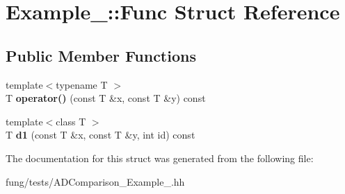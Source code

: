 \hypertarget{structExample__3_1_1Func}{\section{Example\-\_\-:\-:Func Struct Reference}
\label{structExample__3_1_1Func}
}
\subsection*{Public Member Functions}
\begin{DoxyCompactItemize}
\item 
\hypertarget{structExample__3_1_1Func_a9019e97274552641751321381f486201}{{\footnotesize template$<$typename T $>$ }\\T {\bfseries operator()} (const T \&x, const T \&y) const }\label{structExample__3_1_1Func_a9019e97274552641751321381f486201}

\item 
\hypertarget{structExample__3_1_1Func_aaedc133df3b49b8657782003837b66f1}{{\footnotesize template$<$class T $>$ }\\T {\bfseries d1} (const T \&x, const T \&y, int id) const }\label{structExample__3_1_1Func_aaedc133df3b49b8657782003837b66f1}

\end{DoxyCompactItemize}


The documentation for this struct was generated from the following file\-:\begin{DoxyCompactItemize}
\item 
fung/tests/A\-D\-Comparison\-\_\-\-Example\-\_.\-hh\end{DoxyCompactItemize}
